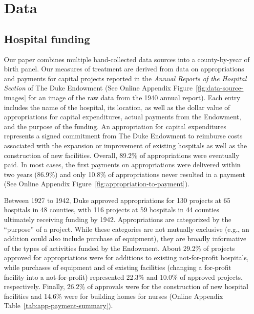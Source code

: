 \documentclass[12pt]{article}
\begin{document}
\section{Data} \label{sec:data}


\subsection{Hospital funding} \label{subsec:duke-data}

Our paper combines multiple hand-collected data sources into a county-by-year of birth panel.
Our measures of treatment are derived from data on appropriations and payments for capital projects reported in the \textit{Annual Reports of the Hospital Section} of The Duke Endowment (See
Online Appendix Figure~\ref{fig:data-source-images} for an image of the raw data from the 1940 annual report).
Each entry includes the name of the hospital, its location, as well as the dollar value of appropriations for capital expenditures, actual payments from the Endowment, and the purpose of the funding.
An appropriation for capital expenditures represents a signed commitment from The Duke Endowment to reimburse costs associated with the expansion or improvement of existing hospitals as well as the construction of new facilities. 
Overall, 89.2\% of appropriations were eventually paid. In most cases, the first payments on appropriations were delivered within two years (86.9\%) and only 10.8\% of appropriations never resulted in a payment (See Online Appendix Figure~\ref{fig:appropriation-to-payment}). 

Between 1927 to 1942, Duke approved appropriations for 130 projects at 65 hospitals in 48 counties, with 116 projects at 59 hospitals in 44 counties ultimately receiving funding by 1942. 
Appropriations are categorized by the ``purpose'' of a project. 
While these categories are not mutually exclusive (e.g., an addition could also include purchase of equipment), they are broadly informative of the types of activities funded by the Endowment. 
About 29.2\% of projects approved for appropriations were for additions to existing not-for-profit hospitals, while purchases of equipment and of existing facilities (changing a for-profit facility into a not-for-profit) represented 22.3\% and 10.0\% of approved projects, respectively. Finally, 26.2\% of approvals were for the construction of new hospital facilities and 14.6\% were for building homes for nurses (Online Appendix Table~\ref{tab:app-payment-summary}).
\end{document}
